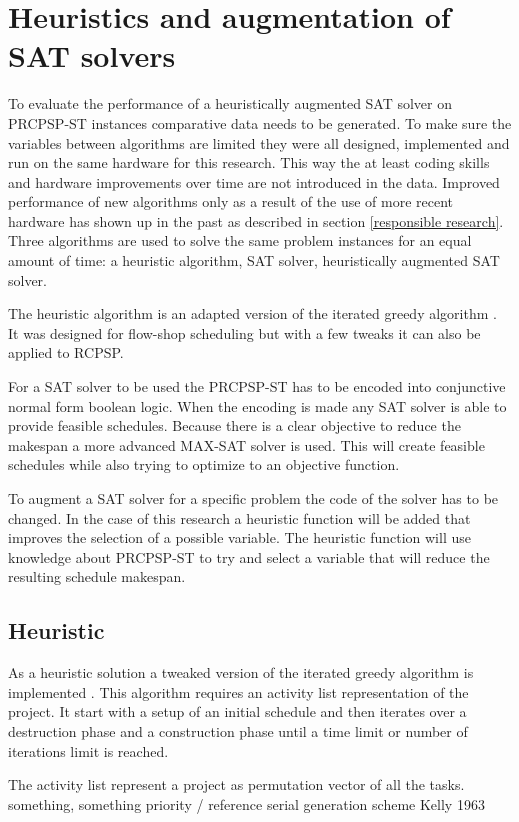 \section{Heuristics and augmentation of SAT solvers}
To evaluate the performance of a heuristically augmented SAT solver on PRCPSP-ST instances comparative data needs to be generated.  To make sure the variables between algorithms are limited they were all designed, implemented and run on the same hardware for this research. This way the at least coding skills and hardware improvements over time are not introduced in the data. Improved performance of new algorithms only as a result of the use of more recent hardware has shown up in the past as described in section \ref{responsible research}. Three algorithms are used to solve the same problem instances for an equal amount of time: a heuristic algorithm, SAT solver, heuristically augmented SAT solver.

The heuristic algorithm is an adapted version of the iterated greedy algorithm \cite{RN32}. It was designed for flow-shop scheduling but with a few tweaks it can also be applied to RCPSP.

For a SAT solver to be used the PRCPSP-ST has to be encoded into conjunctive normal form boolean logic. When the encoding is made any SAT solver is able to provide feasible schedules. Because there is a clear objective to reduce the makespan a more advanced MAX-SAT solver is used. This will create feasible schedules while also trying to optimize to an objective function.

To augment a SAT solver for a specific problem the code of the solver has to be changed. In the case of this research a heuristic function will be added that improves the selection of a possible variable. The heuristic function will use knowledge about PRCPSP-ST to try and select a variable that will reduce the resulting schedule makespan.

\subsection{Heuristic}
As a heuristic solution a tweaked version of the iterated greedy algorithm is implemented \cite{RN32}. This algorithm requires an activity list representation of the project. It start with a setup of an initial schedule and then iterates over a destruction phase and a construction phase until a time limit or number of iterations limit is reached. 

The activity list represent a project as permutation vector of all the tasks. something, something priority / reference serial generation scheme Kelly 1963

